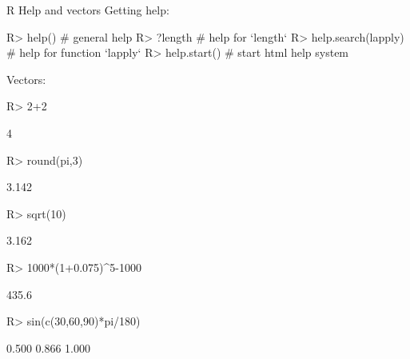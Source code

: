 \documentclass[10pt]{beamer}
\let\proglang=\textsf
\begin{document}
\begin{frame}[fragile]{\proglang{R} Help and vectors}
Getting help:
\begin{Schunk}
\begin{Sinput}
R> help()              # general help
R> ?length             # help for `length`
R> help.search(lapply) # help for function `lapply`
R> help.start()        # start html help system
\end{Sinput}
\end{Schunk}
Vectors:
\begin{Schunk}
\begin{Sinput}
R> 2+2
\end{Sinput}
\begin{Soutput}
[1] 4
\end{Soutput}
\begin{Sinput}
R> round(pi,3)
\end{Sinput}
\begin{Soutput}
[1] 3.142
\end{Soutput}
\begin{Sinput}
R> sqrt(10)
\end{Sinput}
\begin{Soutput}
[1] 3.162
\end{Soutput}
\begin{Sinput}
R> 1000*(1+0.075)^5-1000
\end{Sinput}
\begin{Soutput}
[1] 435.6
\end{Soutput}
\begin{Sinput}
R> sin(c(30,60,90)*pi/180) 
\end{Sinput}
\begin{Soutput}
[1] 0.500 0.866 1.000
\end{Soutput}
\end{Schunk}
\end{frame}
%
\end{document}
